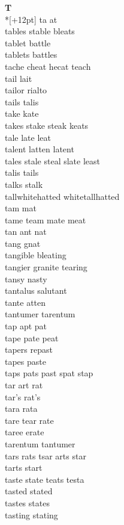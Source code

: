 \vspace{14pt}
\noindent\textbf{\Large T}\\*[+12pt]
ta at\\
tables stable bleats\\
tablet battle\\
tablets battles\\
tache cheat hecat teach\\
tail lait\\
tailor rialto\\
tails talis\\
take kate\\
takes stake steak keats\\
tale late leat\\
talent latten latent\\
tales stale steal slate least\\
talis tails\\
talks stalk\\
tallwhitehatted whitetallhatted\\
tam mat\\
tame team mate meat\\
tan ant nat\\
tang gnat\\
tangible bleating\\
tangier granite tearing\\
tansy nasty\\
tantalus salutant\\
tante atten\\
tantumer tarentum\\
tap apt pat\\
tape pate peat\\
tapers repast\\
tapes paste\\
taps pats past spat stap\\
tar art rat\\
tar's rat's\\
tara rata\\
tare tear rate\\
taree erate\\
tarentum tantumer\\
tars rats tsar arts star\\
tarts start\\
taste state teats testa\\
tasted stated\\
tastes states\\
tasting stating\\
